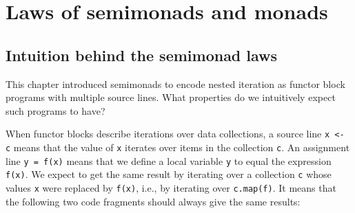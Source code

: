 \begin{comment}
some elementary step of computation that deals with some kind of context
together with a new value and we want this elementary step of the
computation to be usable under flatmap in other words the type of
this elementary step of the computation must be of the kind a to FB
where F is the function that is the type of the argument of want map
so systematically we demanded that the type was of that kind and that
allowed us straightforwardly to derive the types of these moments
you need to get used to these moments in order to be proficient with
them but I hope that this derivation kind of lifts the veil of mystery
from the question of why are the types of that\textsf{'}s chosen like this
and what is this context and they manipulate here are some exercises
for you to get more familiar with using walnuts and to implement simple
examples using set sequence future lists or try and state units as
well as implementing semi modded instances which means simply implementing
flatmap for certain type instructors that concludes part 1 of chapter
7
\end{comment}


\section{Laws of semimonads and monads}

\subsection{Intuition behind the semimonad laws}

This chapter introduced semimonads to encode nested iteration as functor
block programs with multiple source lines. What properties do we intuitively
expect such programs to have?

When functor blocks describe iterations over data collections, a source
line \lstinline!x <- c! means that the value of \lstinline!x! iterates
over items in the collection \lstinline!c!. An assignment line \lstinline!y = f(x)!
means that we define a local variable \lstinline!y! to equal the
expression \lstinline!f(x)!. We expect to get the same result by
iterating over a collection \lstinline!c! whose values \lstinline!x!
were replaced by \lstinline!f(x)!, i.e., by iterating over \lstinline!c.map(f)!.
It means that the following two code fragments should always give
the same results:

\vspace{0.3\baselineskip}

